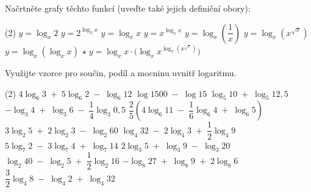 \documentclass[12pt,a4paper]{article}
\begin{document}
\begin{exercise}
    Načrtněte grafy těchto funkcí (uveďte také jejich definiční obory):
    \begin{tasks}(2)
        \task $y = \log_x 2$
        \task $y = 2^{\log_2 x}$
        \task $y = \log_x x$
        \task $y = x^{\log_x x}$
        \task $y = \log_x \left(\dfrac{1}{x}\right)$
        \task $y = \log_x \left(x^{\sqrt{x}}\right)$
        \task $y = \log_x \left(\log_x x\right)$
        \task $\star \; y = \log_x x \cdot \bigl(\log_x x^{\log_x (x^{\sqrt{x}})}\bigr)$
    \end{tasks}
\end{exercise}


\begin{exercise}
    Využijte vzorce pro součin, podíl a mocninu uvnitř logaritmu.
    \begin{tasks}(2)
        \task $4\log_6 3 \;+\; 5\log_6 2 \;-\; \log_6 12$
        \task $\log 1500 \;-\; \log 15$
        \task $\log_5 10 \;+\; \log_5 12{,}5$
        \task $-\log_3 4 \;+\; \log_3 6 \;-\; \dfrac{1}{4} \log_3 0{,}5$
        \task $\dfrac{2}{5} \left( 4\log_6 11 \;-\; \dfrac{1}{6} \log_6 4 \;+\; \log_6 5 \right)$
        \task $3\log_2 5 \;+\; 2\log_2 3 \;-\; \log_2 60$
        \task $\log_4 32 \;-\; 2\log_4 3 \;+\; \dfrac{1}{2} \log_4 9$
        \task $5\log_7 2 \;-\; 3\log_7 4 \;+\; \log_7 14$
        \task $2\log_3 5 \;+\; \log_3 9 \;-\; \log_3 20$
        \task $\log_2 40 \;-\; \log_2 5 \;+\; \dfrac{1}{2} \log_2 16$
        \task $-\log_8 27 \;+\; \log_8 9 \;+\; 2\log_8 6$
        \task $\dfrac{3}{2} \log_4 8 \;-\; \log_4 2 \;+\; \log_4 32$
    \end{tasks}
\end{exercise}
\end{document}
